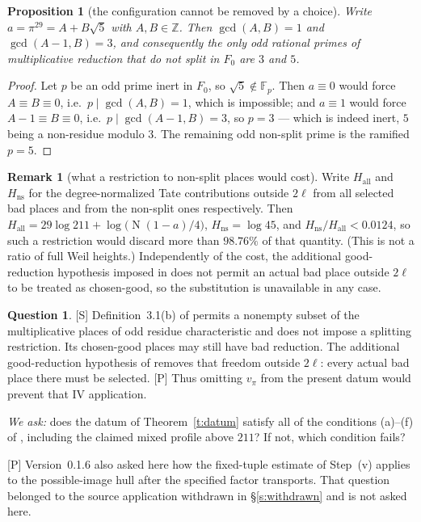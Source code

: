 \documentclass[11pt]{article}
\theoremstyle{plain}
\newtheorem{proposition}[theorem]{Proposition}
\theoremstyle{definition}
\newtheorem{remark}{Remark}
\newtheorem{question}{Question}
\newcommand{\Norm}{\operatorname{N}}
\begin{document}
\begin{proposition}[the configuration cannot be removed by a choice]\label{p:unavoid}
Write $a=\pi^{29}=A+B\sqrt5$ with $A,B\in\mathbb{Z}$.  Then $\gcd(A,B)=1$ and
$\gcd(A-1,B)=3$, and consequently the only odd rational primes of multiplicative
reduction that do \emph{not} split in $F_0$ are $3$ and $5$.
\end{proposition}

\begin{proof}
Let $p$ be an odd prime inert in $F_0$, so $\sqrt5\notin\mathbb{F}_p$.  Then
$a\equiv0$ would force $A\equiv B\equiv0$, i.e.\ $p\mid\gcd(A,B)=1$, which is
impossible; and $a\equiv1$ would force $A-1\equiv B\equiv0$, i.e.\
$p\mid\gcd(A-1,B)=3$, so $p=3$ --- which is indeed inert, $5$ being a non-residue
modulo $3$.  The remaining odd non-split prime is the ramified $p=5$.
\end{proof}

\begin{remark}[what a restriction to non-split places would cost]\label{r:cost}
Write $H_{\mathrm{all}}$ and $H_{\mathrm{ns}}$ for the degree-normalized Tate
contributions outside $2\ell$ from all selected bad places and from the non-split
ones respectively.  Then
$H_{\mathrm{all}}=29\log211+\log\bigl(\Norm(1-a)/4\bigr)$,
$H_{\mathrm{ns}}=\log45$, and $H_{\mathrm{ns}}/H_{\mathrm{all}}<0.0124$, so such a
restriction would discard more than $98.76\%$ of that quantity.  (This is not a
ratio of full Weil heights.)  Independently of the cost, the additional
good-reduction hypothesis imposed in \cite[Thm.~1.10]{IUT4} does not permit an
actual bad place outside $2\ell$ to be treated as chosen-good, so the substitution
is unavailable in any case.
\end{remark}

\begin{question}\label{q:hyp}
\textup{[S]} Definition~3.1(b) of \cite{IUT1} permits a nonempty subset of
the multiplicative places of odd residue characteristic and does not impose
a splitting restriction.  Its chosen-good places may still have bad reduction.
The additional good-reduction hypothesis of \cite[Thm.~1.10]{IUT4} removes
that freedom outside $2\ell$: every actual bad place there must be selected.
\textup{[P]} Thus omitting $v_\pi$ from the present datum would prevent that IV
application.

\emph{We ask:} does the datum of Theorem~\ref{t:datum} satisfy all of the
conditions \textup{(a)--(f)} of \cite[Def.~3.1]{IUT1}, including the claimed
mixed profile above $211$?  If not, which condition fails?

\textup{[P]} Version~0.1.6 also asked here how the fixed-tuple estimate of
Step~(v) applies to the possible-image hull after the specified factor
transports.  That question belonged to the source application withdrawn in
\S\ref{s:withdrawn} and is not asked here.
\end{question}
\end{document}
